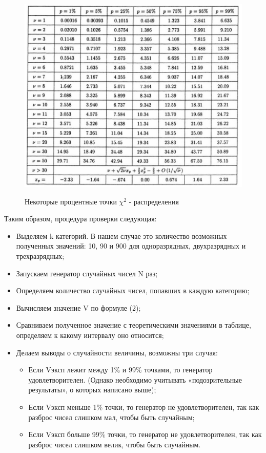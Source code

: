 \documentclass[12pt,a4paper,oneside]{report}
\begin{document}
\begin{figure}[H]
	\centering
	\includegraphics[scale=0.4]{7.jpg}
	\label{fig:screenshot007}
	\caption{Некоторые процентные точки $\chi^2$ - распределения}
\end{figure}

Таким образом, процедура проверки следующая:
\begin{itemize}
    \item Выделяем k категорий. В нашем случае это количество возможных полученных значений: 10, 90 и 900 для одноразрядных, двухразрядных и трехразрядных;
    \item Запускаем генератор случайных чисел N раз;
    \item Определяем количество случайных чисел, попавших в каждую категорию;
    \item Вычисляем значение V по формуле (2);
    \item Сравниваем полученное значение с теоретическими значениями в таблице, определяем к какому интервалу оно относится;
    \item Делаем выводы о случайности величины, возможны три случая:
    \begin{itemize}
        \item Если Vэксп лежит между 1\% и 99\% точками, то генератор удовлетворителен. (Однако необходимо учитывать «подозрительные результаты», о которых написано выше);
        \item Если Vэксп меньше 1\% точки, то генератор не удовлетворителен, так как разброс чисел слишком мал, чтобы быть случайным;
        \item Если Vэксп больше 99\%  точки, то генератор не удовлетворителен, так как разброс чисел слишком велик, чтобы быть случайным.
    \end{itemize}
\end{itemize}
\end{document}
